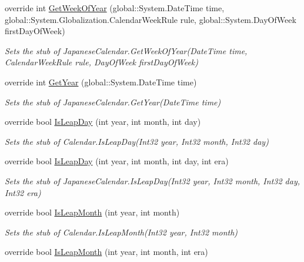 \begin{DoxyCompactItemize}
override int \hyperlink{class_system_1_1_globalization_1_1_fakes_1_1_stub_japanese_calendar_a43d336eac025c1b4a8e25e6e60d6669c}{Get\-Week\-Of\-Year} (global\-::\-System.\-Date\-Time time, global\-::\-System.\-Globalization.\-Calendar\-Week\-Rule rule, global\-::\-System.\-Day\-Of\-Week first\-Day\-Of\-Week)
\begin{DoxyCompactList}\small\item\em Sets the stub of Japanese\-Calendar.\-Get\-Week\-Of\-Year(\-Date\-Time time, Calendar\-Week\-Rule rule, Day\-Of\-Week first\-Day\-Of\-Week)\end{DoxyCompactList}\item 
override int \hyperlink{class_system_1_1_globalization_1_1_fakes_1_1_stub_japanese_calendar_a6e0534648c2e923fc9e44f8c6b339fe5}{Get\-Year} (global\-::\-System.\-Date\-Time time)
\begin{DoxyCompactList}\small\item\em Sets the stub of Japanese\-Calendar.\-Get\-Year(\-Date\-Time time)\end{DoxyCompactList}\item 
override bool \hyperlink{class_system_1_1_globalization_1_1_fakes_1_1_stub_japanese_calendar_ae2b37f20cb0fe8b00af95dd319ca99a7}{Is\-Leap\-Day} (int year, int month, int day)
\begin{DoxyCompactList}\small\item\em Sets the stub of Calendar.\-Is\-Leap\-Day(\-Int32 year, Int32 month, Int32 day)\end{DoxyCompactList}\item 
override bool \hyperlink{class_system_1_1_globalization_1_1_fakes_1_1_stub_japanese_calendar_a367184280609e27d6d1f445ebd4e16b7}{Is\-Leap\-Day} (int year, int month, int day, int era)
\begin{DoxyCompactList}\small\item\em Sets the stub of Japanese\-Calendar.\-Is\-Leap\-Day(\-Int32 year, Int32 month, Int32 day, Int32 era)\end{DoxyCompactList}\item 
override bool \hyperlink{class_system_1_1_globalization_1_1_fakes_1_1_stub_japanese_calendar_a177e73df751a82ff90fe4c7c09268db5}{Is\-Leap\-Month} (int year, int month)
\begin{DoxyCompactList}\small\item\em Sets the stub of Calendar.\-Is\-Leap\-Month(\-Int32 year, Int32 month)\end{DoxyCompactList}\item 
override bool \hyperlink{class_system_1_1_globalization_1_1_fakes_1_1_stub_japanese_calendar_ac331f80a3bca568b3535645d1ece467c}{Is\-Leap\-Month} (int year, int month, int era)

\end{DoxyCompactItemize}
